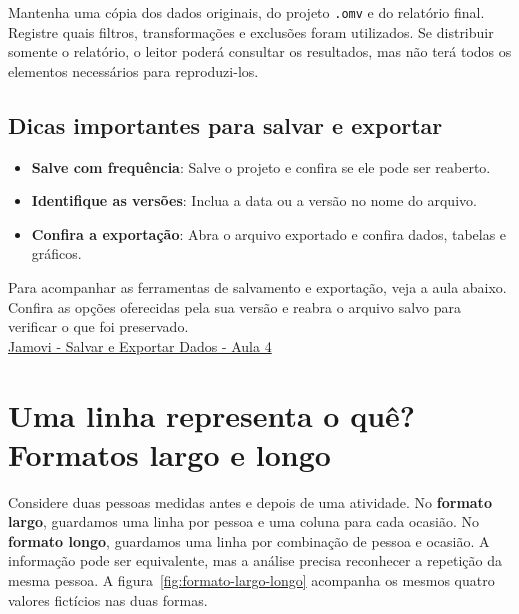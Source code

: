 Mantenha uma cópia dos dados originais, do projeto \texttt{.omv} e do relatório final. Registre quais filtros, transformações e exclusões foram utilizados. Se distribuir somente o relatório, o leitor poderá consultar os resultados, mas não terá todos os elementos necessários para reproduzi-los.

\subsection{Dicas importantes para salvar e exportar}

\begin{itemize}
    \item \textbf{Salve com frequência}: Salve o projeto e confira se ele pode ser reaberto.
    \item \textbf{Identifique as versões}: Inclua a data ou a versão no nome do arquivo.
    \item \textbf{Confira a exportação}: Abra o arquivo exportado e confira dados, tabelas e gráficos.
\end{itemize}

\begin{tcolorbox}[colback=white,colframe=red,title={\faPlayCircle \ Dica de Conteúdo}]
  Para acompanhar as ferramentas de salvamento e exportação, veja a aula abaixo. Confira as opções oferecidas pela sua versão e reabra o arquivo salvo para verificar o que foi preservado.\\
  \textcolor{red}{\faYoutube} \href{https://www.youtube.com/watch?v=tspLxfl3uZk}{Jamovi - Salvar e Exportar Dados - Aula 4}
\end{tcolorbox}


\section{Uma linha representa o quê? Formatos largo e longo}
\label{sec:estrutura-dados}

Considere duas pessoas medidas antes e depois de uma atividade. No \textbf{formato largo}, guardamos uma linha por pessoa e uma coluna para cada ocasião. No \textbf{formato longo}, guardamos uma linha por combinação de pessoa e ocasião. A informação pode ser equivalente, mas a análise precisa reconhecer a repetição da mesma pessoa. A figura~\ref{fig:formato-largo-longo} acompanha os mesmos quatro valores fictícios nas duas formas.


